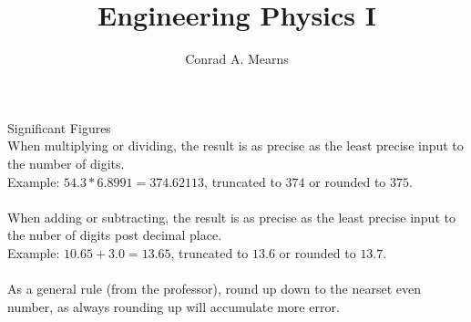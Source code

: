 \documentclass{article}
\title{Engineering Physics I}
\author{Conrad A. Mearns}
\begin{document}
\maketitle

\noindent
\Large
Significant Figures\\
\normalsize
\noindent
When multiplying or dividing, the result is as precise as the least precise input to the number of digits.\\
Example: $54.3 * 6.8991 = 374.62113$, truncated to $374$ or rounded to $375$.\\\\

\noindent
When adding or subtracting, the result is as precise as the least precise input to the nuber of digits post decimal place.\\
Example: $10.65 + 3.0 = 13.65$, truncated to $13.6$ or rounded to $13.7$.\\\\

\noindent
As a general rule (from the professor), round up down to the nearset even number, as always rounding up will accumulate more error.
\end{document}
